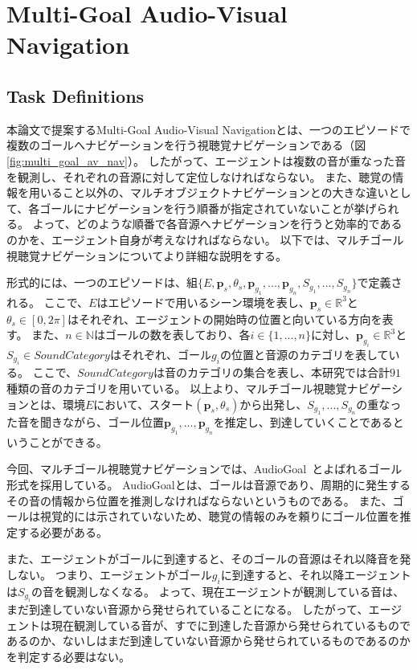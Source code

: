\section{Multi-Goal Audio-Visual Navigation}

\subsection{Task Definitions}


本論文で提案するMulti-Goal Audio-Visual Navigationとは、一つのエピソードで複数のゴールへナビゲーションを行う視聴覚ナビゲーションである（図\ref{fig:multi_goal_av_nav}）。
したがって、エージェントは複数の音が重なった音を観測し、それぞれの音源に対して定位しなければならない。
また、聴覚の情報を用いること以外の、マルチオブジェクトナビゲーションとの大きな違いとして、各ゴールにナビゲーションを行う順番が指定されていないことが挙げられる。
よって、どのような順番で各音源へナビゲーションを行うと効率的であるのかを、エージェント自身が考えなければならない。
以下では、マルチゴール視聴覚ナビゲーションについてより詳細な説明をする。

形式的には、一つのエピソードは、組$\{E, \bm{p}_s, \theta_s, \bm{p}_{g_1}, ..., \bm{p}_{g_n}, S_{g_1}, ..., S_{g_n}\}$で定義される。
ここで、$E$はエピソードで用いるシーン環境を表し、$\bm{p}_s \in \mathbb{R}^3$と$\theta_s \in [0, 2\pi]$はそれぞれ、エージェントの開始時の位置と向いている方向を表す。
また、$n \in \mathbb{N}$はゴールの数を表しており、各$i \in \{1, ..., n\}$に対し、$\bm{p}_{g_i} \in \mathbb{R}^3$と$S_{g_i} \in SoundCategory$はそれぞれ、ゴール$g_i$の位置と音源のカテゴリを表している。
ここで、$SoundCategory$は音のカテゴリの集合を表し、本研究では合計$91$種類の音のカテゴリを用いている。
以上より、マルチゴール視聴覚ナビゲーションとは、環境$E$において、スタート$(\bm{p}_s, \theta_s)$から出発し、$S_{g_1}, ..., S_{g_n}$の重なった音を聞きながら、ゴール位置$\bm{p}_{g_1}, ..., \bm{p}_{g_n}$を推定し、到達していくことであるということができる。

今回、マルチゴール視聴覚ナビゲーションでは、AudioGoal~\cite{chen2020soundspaces}とよばれるゴール形式を採用している。
AudioGoalとは、ゴールは音源であり、周期的に発生するその音の情報から位置を推測しなければならないというものである。
また、ゴールは視覚的には示されていないため、聴覚の情報のみを頼りにゴール位置を推定する必要がある。

また、エージェントがゴールに到達すると、そのゴールの音源はそれ以降音を発しない。
つまり、エージェントがゴール$g_i$に到達すると、それ以降エージェントは$S_{g_i}$の音を観測しなくなる。
よって、現在エージェントが観測している音は、まだ到達していない音源から発せられていることになる。
したがって、エージェントは現在観測している音が、すでに到達した音源から発せられているものであるのか、ないしはまだ到達していない音源から発せられているものであるのかを判定する必要はない。



